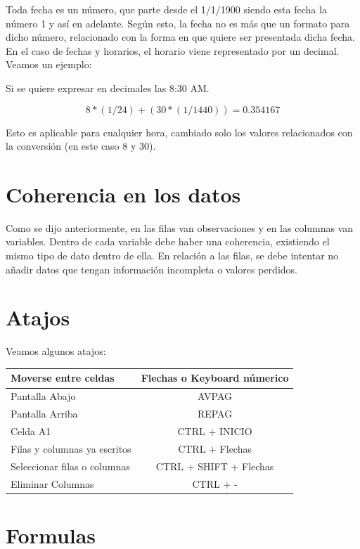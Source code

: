 \documentclass[12 pt,letterpaper]{article}
\begin{document}
Toda fecha es un número, que parte desde el 1/1/1900 siendo esta fecha la número 1 y así en adelante. Según esto, la fecha no es más que un formato para dicho número, relacionado con la forma en que quiere ser presentada dicha fecha. En el caso de fechas y horarios, el horario viene representado por un decimal. Veamos un ejemplo:
	
Si se quiere expresar en decimales las 8:30 AM.
	
\[ 8*(1/24)+(30*(1/1440))=0.354167 \]
	
Esto es aplicable para cualquier hora, cambiado solo los valores relacionados con la conversión (en este caso 8 y 30).
	
\section{Coherencia en los datos}

Como se dijo anteriormente, en las filas van observaciones y en las columnas van variables. Dentro de cada variable debe haber una coherencia, existiendo el mismo tipo de dato dentro de ella. En relación a las filas, se debe intentar no añadir datos que tengan información incompleta o valores perdidos. 

\section{Atajos}

Veamos algunos atajos:

\begin{center}
	\begin{tabular}{|l|c|}
		\hline
		Moverse entre celdas & Flechas o Keyboard númerico \\
		\hline
		Pantalla Abajo & AVPAG \\
		\hline
		Pantalla Arriba & REPAG \\
		\hline
		Celda A1 & CTRL + INICIO \\
		\hline
		Filas y columnas ya escritos & CTRL + Flechas \\
		\hline
		Seleccionar filas o columnas & CTRL + SHIFT + Flechas \\
		\hline
		Eliminar Columnas & CTRL + - \\
		\hline
	\end{tabular}
\end{center}

\section{Formulas}
\end{document}
